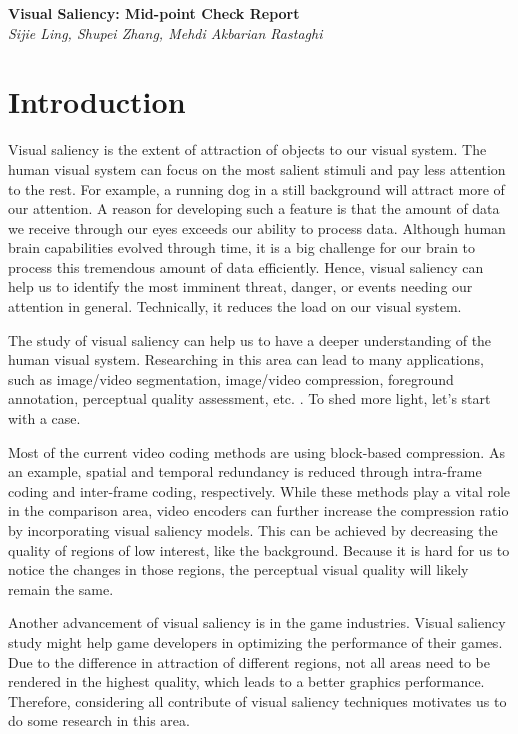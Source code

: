 \documentclass[12pt]{article}
\begin{document}
\begin{center}
{\bf \Large Visual Saliency: Mid-point Check Report}  \\
\vspace{.1in}
{\em Sijie Ling, Shupei Zhang, Mehdi Akbarian Rastaghi}
\end{center}
\section{Introduction}

Visual saliency is the extent of attraction of objects to our visual system. 
The human visual system can focus on the most salient stimuli and pay less attention to the rest. 
For example, a running dog in a still background will attract more of our attention. 
A reason for developing such a feature is that the amount of data we receive through our eyes exceeds our ability to process data. 
Although human brain capabilities evolved through time, it is a big challenge for our brain to process this tremendous amount of data efficiently. 
Hence, visual saliency can help us to identify the most imminent threat, danger, or events needing our attention in general. 
Technically, it reduces the load on our visual system. 

The study of visual saliency can help us to have a deeper understanding of the human visual system. 
Researching in this area can lead to many applications, such as image/video segmentation, image/video compression, foreground annotation, perceptual quality assessment, etc. \cite{congReviewVisualSaliency2019}.  
To shed more light, let's start with a case. 

Most of the current video coding methods are using block-based compression. 
As an example, spatial and temporal redundancy is reduced through intra-frame coding and inter-frame coding, respectively\cite{sullivanOverviewHighEfficiency2012}. 
While these methods play a vital role in the comparison area, video encoders can further increase the compression ratio by incorporating visual saliency models. 
This can be achieved by decreasing the quality of regions of low interest, like the background. 
Because it is hard for us to notice the changes in those regions, the perceptual visual quality will likely remain the same.

Another advancement of visual saliency is in the game industries. 
Visual saliency study might help game developers in optimizing the performance of their games. 
Due to the difference in attraction of different regions, not all areas need to be rendered in the highest quality, which leads to a better graphics performance. 
Therefore, considering all contribute of visual saliency techniques motivates us to do some research in this area. 
\end{document}

